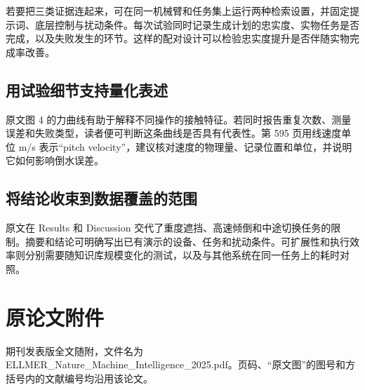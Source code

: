 \documentclass[UTF8,11pt,a4paper,twoside,fontset=none,heading=false]{ctexart}
\begin{document}
若要把三类证据连起来，可在同一机械臂和任务集上运行两种检索设置，并固定提示词、底层控制与扰动条件。每次试验同时记录生成计划的忠实度、实物任务是否完成，以及失败发生的环节。这样的配对设计可以检验忠实度提升是否伴随实物完成率改善。

\subsection*{用试验细节支持量化表述}
原文图 4 的力曲线有助于解释不同操作的接触特征。若同时报告重复次数、测量误差和失败类型，读者便可判断这条曲线是否具有代表性。第 595 页用线速度单位 m/s 表示“pitch velocity”，建议核对速度的物理量、记录位置和单位，并说明它如何影响倒水误差。

\subsection*{将结论收束到数据覆盖的范围}
原文在 Results 和 Discussion 交代了重度遮挡、高速倾倒和中途切换任务的限制。摘要和结论可明确写出已有演示的设备、任务和扰动条件。可扩展性和执行效率则分别需要随知识库规模变化的测试，以及与其他系统在同一任务上的耗时对照。

\section{原论文附件}

期刊发表版全文随附，文件名为 ELLMER\_Nature\_Machine\_Intelligence\_2025.pdf。页码、“原文图”的图号和方括号内的文献编号均沿用该论文。
\end{document}
